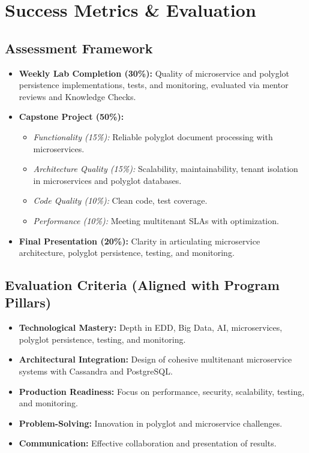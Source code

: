 \documentclass[11pt]{article}
\begin{document}
\section{Success Metrics \& Evaluation}

\subsection{Assessment Framework}
\begin{itemize}
    \item \textbf{Weekly Lab Completion (30\%):} Quality of microservice and polyglot persistence implementations, tests, and monitoring, evaluated via mentor reviews and Knowledge Checks.
    \item \textbf{Capstone Project (50\%):}
        \begin{itemize}
            \item \textit{Functionality (15\%):} Reliable polyglot document processing with microservices.
            \item \textit{Architecture Quality (15\%):} Scalability, maintainability, tenant isolation in microservices and polyglot databases.
            \item \textit{Code Quality (10\%):} Clean code, test coverage.
            \item \textit{Performance (10\%):} Meeting multitenant SLAs with optimization.
        \end{itemize}
    \item \textbf{Final Presentation (20\%):} Clarity in articulating microservice architecture, polyglot persistence, testing, and monitoring.
\end{itemize}

\subsection{Evaluation Criteria (Aligned with Program Pillars)}
\begin{itemize}
    \item \textbf{Technological Mastery:} Depth in EDD, Big Data, AI, microservices, polyglot persistence, testing, and monitoring.
    \item \textbf{Architectural Integration:} Design of cohesive multitenant microservice systems with Cassandra and PostgreSQL.
    \item \textbf{Production Readiness:} Focus on performance, security, scalability, testing, and monitoring.
    \item \textbf{Problem-Solving:} Innovation in polyglot and microservice challenges.
    \item \textbf{Communication:} Effective collaboration and presentation of results.
\end{itemize}
\end{document}
